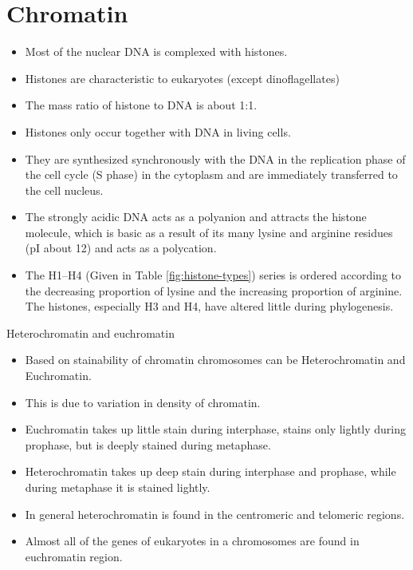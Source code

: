 \documentclass[11pt,dvipsnames,ignorenonframetext,aspectratio=169]{beamer}
\providecommand{\tightlist}{%
  \setlength{\itemsep}{0pt}\setlength{\parskip}{0pt}}
\begin{document}
\hypertarget{chromatin}{%
\section{Chromatin}\label{chromatin}}

\begin{frame}{}
\protect\hypertarget{section-8}{}
\small

\begin{itemize}
\tightlist
\item
  Most of the nuclear DNA is complexed with histones.
\item
  Histones are characteristic to eukaryotes (except dinoflagellates)
\item
  The mass ratio of histone to DNA is about 1:1.
\item
  Histones only occur together with DNA in living cells.
\item
  They are synthesized synchronously with the DNA in the replication
  phase of the cell cycle (S phase) in the cytoplasm and are immediately
  transferred to the cell nucleus.
\item
  The strongly acidic DNA acts as a polyanion and attracts the histone
  molecule, which is basic as a result of its many lysine and arginine
  residues (pI about 12) and acts as a polycation.
\item
  The H1--H4 (Given in Table \ref{fig:histone-types}) series is ordered
  according to the decreasing proportion of lysine and the increasing
  proportion of arginine. The histones, especially H3 and H4, have
  altered little during phylogenesis.
\end{itemize}
\end{frame}

\begin{frame}{Heterochromatin and euchromatin}
\protect\hypertarget{heterochromatin-and-euchromatin}{}
\begin{itemize}
\tightlist
\item
  Based on stainability of chromatin chromosomes can be Heterochromatin
  and Euchromatin.
\item
  This is due to variation in density of chromatin.
\item
  Euchromatin takes up little stain during interphase, stains only
  lightly during prophase, but is deeply stained during metaphase.
\item
  Heterochromatin takes up deep stain during interphase and prophase,
  while during metaphase it is stained lightly.
\item
  In general heterochromatin is found in the centromeric and telomeric
  regions.
\item
  Almost all of the genes of eukaryotes in a chromosomes are found in
  euchromatin region.
\end{itemize}
\end{frame}
\end{document}
